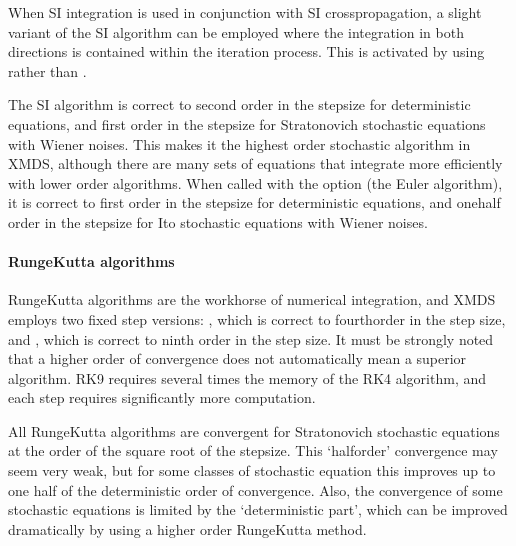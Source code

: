 \documentclass[letterpaper,10pt,english]{sphinxmanual}
\begin{document}
\sphinxAtStartPar
When SI integration is used in conjunction with SI cross\sphinxhyphen{}propagation, a slight variant of the SI algorithm can be employed where the integration in both directions is contained within the iteration process.  This is activated by using  rather than .

\sphinxAtStartPar
The SI algorithm is correct to second order in the step\sphinxhyphen{}size for deterministic equations, and first order in the step\sphinxhyphen{}size for Stratonovich stochastic equations with Wiener noises.  This makes it the highest order stochastic algorithm in XMDS, although there are many sets of equations that integrate more efficiently with lower order algorithms.  When called with the  option (the Euler algorithm), it is correct to first order in the step\sphinxhyphen{}size for deterministic equations, and one\sphinxhyphen{}half order in the step\sphinxhyphen{}size for Ito stochastic equations with Wiener noises.

\ignorespaces 

\paragraph{Runge\sphinxhyphen{}Kutta algorithms}
\label{\detokenize{reference_elements:runge-kutta-algorithms}}\label{\detokenize{reference_elements:rk4}}\label{\detokenize{reference_elements:index-83}}
\sphinxAtStartPar
Runge\sphinxhyphen{}Kutta algorithms are the workhorse of numerical integration, and XMDS employs two fixed step versions: , which is correct to fourth\sphinxhyphen{}order in the step size, and , which is correct to ninth order in the step size.  It must be strongly noted that a higher order of convergence does not automatically mean a superior algorithm.  RK9 requires several times the memory of the RK4 algorithm, and each step requires significantly more computation.

\sphinxAtStartPar
All Runge\sphinxhyphen{}Kutta algorithms are convergent for Stratonovich stochastic equations at the order of the square root of the step\sphinxhyphen{}size.  This ‘half\sphinxhyphen{}order’ convergence may seem very weak, but for some classes of stochastic equation this improves up to one half of the deterministic order of convergence.  Also, the convergence of some stochastic equations is limited by the ‘deterministic part’, which can be improved dramatically by using a higher order Runge\sphinxhyphen{}Kutta method.
\end{document}
